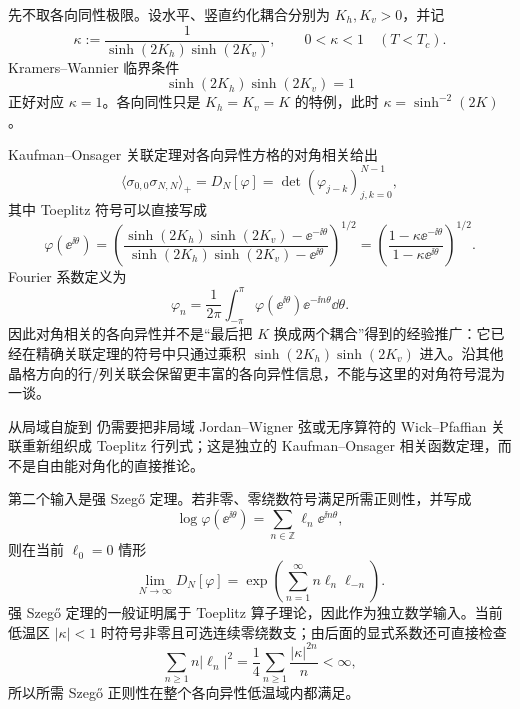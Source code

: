 先不取各向同性极限。设水平、竖直约化耦合分别为 \(K_h,K_v>0\)，并记
\begin{equation}
 \kappa
 :=\frac{1}{\sinh(2K_h)\sinh(2K_v)},
 \qquad
 0<\kappa<1\quad(T<T_c).
 \label{eq:phys-sm-yang-k-parameter}
\end{equation}
Kramers--Wannier 临界条件
\[
 \sinh(2K_h)\sinh(2K_v)=1
\]
正好对应 \(\kappa=1\)。各向同性只是 \(K_h=K_v=K\) 的特例，此时 \(\kappa=\sinh^{-2}(2K)\)。

Kaufman--Onsager 关联定理对各向异性方格的对角相关给出
\begin{equation}
 \langle\sigma_{0,0}\sigma_{N,N}\rangle_+
 =D_N[\varphi]
 =\det(\varphi_{j-k})_{j,k=0}^{N-1},
 \label{eq:phys-sm-yang-toeplitz}
\end{equation}
其中 Toeplitz 符号可以直接写成
\begin{equation}
 \varphi(\ee^{\ii\theta})
 =\left(
 \frac{\sinh(2K_h)\sinh(2K_v)-\ee^{-\ii\theta}}
 {\sinh(2K_h)\sinh(2K_v)-\ee^{\ii\theta}}
 \right)^{1/2}
 =\left(
 \frac{1-\kappa\ee^{-\ii\theta}}
 {1-\kappa\ee^{\ii\theta}}
 \right)^{1/2}.
 \label{eq:phys-sm-yang-symbol}
\end{equation}
Fourier 系数定义为
\[
 \varphi_n=\frac{1}{2\pi}
 \int_{-\pi}^{\pi}
 \varphi(\ee^{\ii\theta})\ee^{-\ii n\theta}\dd\theta.
\]
因此对角相关的各向异性并不是“最后把 \(K\) 换成两个耦合”得到的经验推广：它已经在精确关联定理的符号中只通过乘积
\(
\sinh(2K_h)\sinh(2K_v)
\)
进入。沿其他晶格方向的行/列关联会保留更丰富的各向异性信息，不能与这里的对角符号混为一谈。

从局域自旋到 仍需要把非局域 Jordan--Wigner 弦或无序算符的 Wick--Pfaffian 关联重新组织成 Toeplitz 行列式；这是独立的 Kaufman--Onsager 相关函数定理，而不是自由能对角化的直接推论。

第二个输入是强 Szeg\H{o} 定理。若非零、零绕数符号满足所需正则性，并写成
\begin{equation}
 \log\varphi(\ee^{\ii\theta})
 =\sum_{n\in\mathbb Z}\ell_n\ee^{\ii n\theta},
 \label{eq:phys-sm-log-symbol-fourier}
\end{equation}
则在当前 \(\ell_0=0\) 情形
\begin{equation}
 \lim_{N\to\infty}D_N[\varphi]
 =\exp\!\left(
 \sum_{n=1}^{\infty}n\ell_n\ell_{-n}
 \right).
 \label{eq:phys-sm-szego-special}
\end{equation}
强 Szeg\H{o} 定理的一般证明属于 Toeplitz 算子理论，因此作为独立数学输入。当前低温区 \(|\kappa|<1\) 时符号非零且可选连续零绕数支；由后面的显式系数还可直接检查
\[
 \sum_{n\ge1}n|\ell_n|^2
 =\frac14\sum_{n\ge1}\frac{|\kappa|^{2n}}{n}<\infty,
\]
所以所需 Szeg\H{o} 正则性在整个各向异性低温域内都满足。

